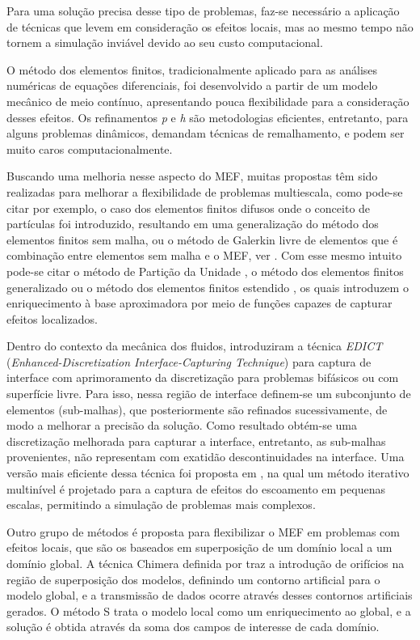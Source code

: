 \documentclass[tese_patricia.tex]{subfiles}
\begin{document}
Para uma solução precisa desse tipo de problemas, faz-se necessário a aplicação de técnicas que levem em consideração os efeitos locais, mas ao mesmo tempo não tornem a simulação inviável devido ao seu custo computacional.

O método dos elementos finitos, tradicionalmente aplicado para as análises numéricas de equações diferenciais, foi desenvolvido a partir de um modelo mecânico de meio contínuo, apresentando pouca flexibilidade para a consideração desses efeitos. Os refinamentos \textit{p} e \textit{h} são metodologias eficientes, entretanto, para alguns problemas dinâmicos, demandam técnicas de remalhamento, e podem ser muito caros computacionalmente.

Buscando uma melhoria nesse aspecto do MEF, muitas propostas têm sido realizadas para melhorar a flexibilidade de problemas multiescala, como pode-se citar por exemplo, o caso dos elementos finitos difusos \cite{NayrolesTV:1992} onde o conceito de partículas foi introduzido, resultando em uma generalização do método dos elementos finitos sem malha, ou o método de Galerkin livre de elementos que é combinação entre elementos sem malha e o MEF, ver . Com esse mesmo intuito pode-se citar o método de Partição da Unidade \cite{MelenkB:1996}, o método dos elementos finitos generalizado \cite{StrouboulisCB:2001} ou o método dos elementos finitos estendido \cite{FarhatHF:2001}, os quais introduzem o enriquecimento à base aproximadora por meio de funções capazes de capturar efeitos localizados.

Dentro do contexto da mecânica dos fluidos,  introduziram a técnica \textit{EDICT} (\textit{Enhanced-Discretization Interface-Capturing Technique}) para captura de interface com aprimoramento da discretização para problemas bifásicos ou com superfície livre. Para isso, nessa região de interface definem-se um subconjunto de elementos (sub-malhas), que posteriormente são refinados sucessivamente, de modo a melhorar a precisão da solução. Como resultado obtém-se uma discretização melhorada para capturar a interface, entretanto, as sub-malhas provenientes, não representam com exatidão descontinuidades na interface. Uma versão mais eficiente dessa técnica foi proposta em , na qual um método iterativo multinível é projetado para a captura de efeitos do escoamento em pequenas escalas, permitindo a simulação de problemas mais complexos.

Outro grupo de métodos é proposta para flexibilizar o MEF em problemas com efeitos locais, que são os baseados em superposição de um domínio local a um domínio global. A técnica Chimera definida por  traz a introdução de orifícios na região de superposição dos modelos, definindo um contorno artificial para o modelo global, e a transmissão de dados ocorre através desses contornos artificiais gerados. O método S \cite{Fish:1992} trata o modelo local como um enriquecimento ao global, e a solução é obtida através da soma dos campos de interesse de cada domínio.
\end{document}
